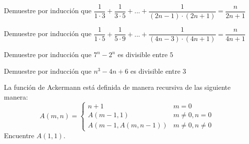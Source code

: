 	\begin{problema}
		Demuestre por inducción que 
		$\displaystyle \dfrac{1}{1\cdot 3}+\dfrac{1}{3\cdot 5}+...+\dfrac{1}{\left( 2n-1 \right)\cdot \left( 2n+1 \right)}=\dfrac{n}{2n+1}$
	\end{problema}



	\begin{problema}
		Demuestre por inducción que 		
		$\displaystyle \dfrac{1}{1\cdot 5}+ \dfrac{1}{5 \cdot 9}+...+\dfrac{1}{(4n-3)\cdot (4n+1)}=\dfrac{n}{4n+1}$
	\end{problema}



	\begin{problema}
		Demuestre por inducción que 		
		$7^{n}-2^{n}$ es divisible entre $5$
	\end{problema}



	\begin{problema}
		Demuestre por inducción que 		
		$n^{3}-4n+6$ es divisible entre $3$
	\end{problema}



	\begin{problema}
		La función de Ackermann está definida de manera recursiva de las siguiente manera:
		$$
		A(m,n)=
		\begin{cases}
			n+1 & m=0\\
			A(m-1,1) & m\neq0, n=0 \\
			A(m-1, A(m,n-1)) & m\neq 0, n\neq 0
		\end{cases}
		$$
		Encuentre $A(1,1)$.		
	\end{problema}
	
